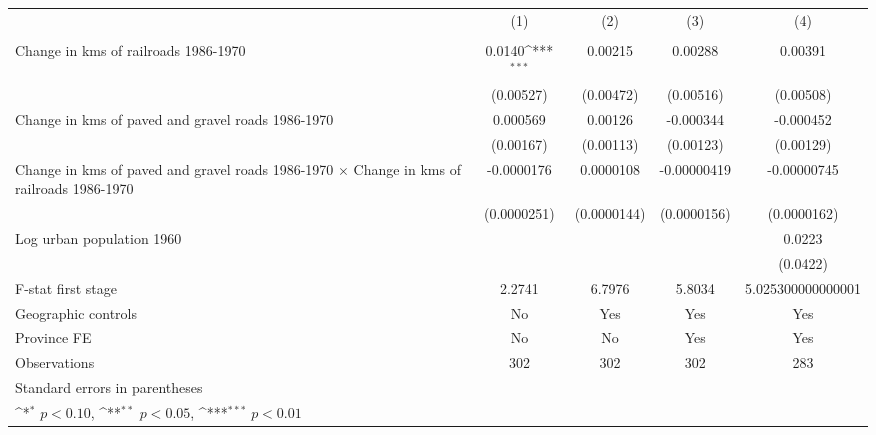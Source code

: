 {
\def\sym#1{\ifmmode^{#1}\else\(^{#1}\)\fi}
\begin{tabular}{l*{4}{c}}
\hline\hline
                &\multicolumn{1}{c}{(1)}&\multicolumn{1}{c}{(2)}&\multicolumn{1}{c}{(3)}&\multicolumn{1}{c}{(4)}\\
                &\multicolumn{1}{c}{}&\multicolumn{1}{c}{}&\multicolumn{1}{c}{}&\multicolumn{1}{c}{}\\
\hline
Change in kms of railroads 1986-1970&   0.0140\sym{***}&  0.00215         &  0.00288         &  0.00391         \\
                &(0.00527)         &(0.00472)         &(0.00516)         &(0.00508)         \\
[1em]
Change in kms of paved and gravel roads 1986-1970& 0.000569         &  0.00126         &-0.000344         &-0.000452         \\
                &(0.00167)         &(0.00113)         &(0.00123)         &(0.00129)         \\
[1em]
Change in kms of paved and gravel roads 1986-1970 $\times$ Change in kms of railroads 1986-1970&-0.0000176         &0.0000108         &-0.00000419         &-0.00000745         \\
                &(0.0000251)         &(0.0000144)         &(0.0000156)         &(0.0000162)         \\
[1em]
Log urban population 1960&                  &                  &                  &   0.0223         \\
                &                  &                  &                  & (0.0422)         \\
\hline
F-stat first stage&   2.2741         &   6.7976         &   5.8034         &5.025300000000001         \\
Geographic controls&       No         &      Yes         &      Yes         &      Yes         \\
Province FE     &       No         &       No         &      Yes         &      Yes         \\
Observations    &      302         &      302         &      302         &      283         \\
\hline\hline
\multicolumn{5}{l}{\footnotesize Standard errors in parentheses}\\
\multicolumn{5}{l}{\footnotesize \sym{*} \(p<0.10\), \sym{**} \(p<0.05\), \sym{***} \(p<0.01\)}\\
\end{tabular}
}
